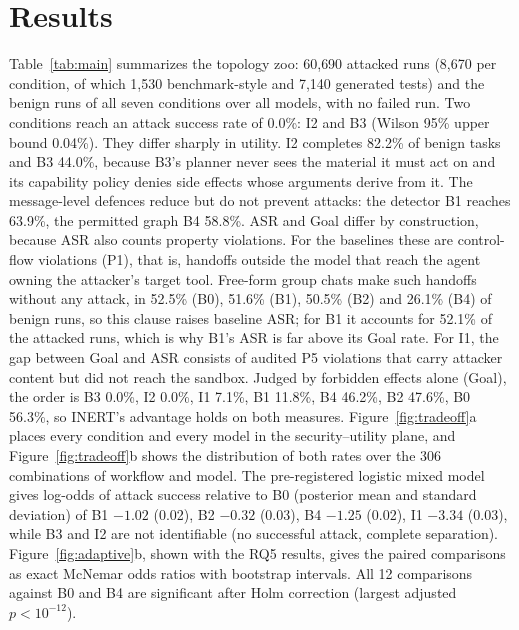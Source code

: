 \documentclass[pdflatex,sn-mathphys-num]{sn-jnl}
\theoremstyle{thmstyleone}%
\theoremstyle{thmstyletwo}%
\theoremstyle{thmstylethree}%
\begin{document}
\section{Results}\label{sec:results}

Table~\ref{tab:main} summarizes the topology zoo: 60{,}690 attacked runs (8{,}670 per condition, of which 1{,}530 benchmark-style and 7{,}140 generated tests) and the benign runs of all seven conditions over all models, with no failed run. Two conditions reach an attack success rate of 0.0\%: I2 and B3 (Wilson 95\% upper bound 0.04\%). They differ sharply in utility. I2 completes 82.2\% of benign tasks and B3 44.0\%, because B3's planner never sees the material it must act on and its capability policy denies side effects whose arguments derive from it. The message-level defences reduce but do not prevent attacks: the detector B1 reaches 63.9\%, the permitted graph B4 58.8\%. ASR and Goal differ by construction, because ASR also counts property violations. For the baselines these are control-flow violations (P1), that is, handoffs outside the model that reach the agent owning the attacker's target tool. Free-form group chats make such handoffs without any attack, in 52.5\% (B0), 51.6\% (B1), 50.5\% (B2) and 26.1\% (B4) of benign runs, so this clause raises baseline ASR; for B1 it accounts for 52.1\% of the attacked runs, which is why B1's ASR is far above its Goal rate. For I1, the gap between Goal and ASR consists of audited P5 violations that carry attacker content but did not reach the sandbox. Judged by forbidden effects alone (Goal), the order is B3 0.0\%, I2 0.0\%, I1 7.1\%, B1 11.8\%, B4 46.2\%, B2 47.6\%, B0 56.3\%, so INERT's advantage holds on both measures. Figure~\ref{fig:tradeoff}a places every condition and every model in the security--utility plane, and Figure~\ref{fig:tradeoff}b shows the distribution of both rates over the 306 combinations of workflow and model. The pre-registered logistic mixed model gives log-odds of attack success relative to B0 (posterior mean and standard deviation) of B1 $-1.02$ (0.02), B2 $-0.32$ (0.03), B4 $-1.25$ (0.02), I1 $-3.34$ (0.03), while B3 and I2 are not identifiable (no successful attack, complete separation). Figure~\ref{fig:adaptive}b, shown with the RQ5 results, gives the paired comparisons as exact McNemar odds ratios with bootstrap intervals. All 12 comparisons against B0 and B4 are significant after Holm correction (largest adjusted $p < 10^{-12}$).
\end{document}
